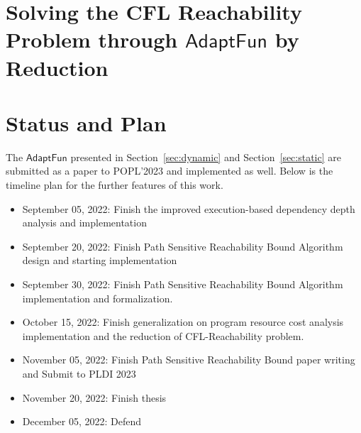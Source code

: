 \documentclass[a4paper,11pt]{article}
\newcommand{\THESYSTEM}{\textsf{AdaptFun}}
\begin{document}
\section{Solving the CFL Reachability Problem through $\THESYSTEM$ by Reduction}
\label{sec:cfl_reduction}


\section{Status and Plan}
The $\THESYSTEM$ presented in Section~\ref{sec:dynamic} and Section~\ref{sec:static} are submitted as a paper to POPL'2023 and implemented as well. Below is the timeline plan for the further features of this work.
\begin{itemize}
\item September 05, 2022: Finish the improved execution-based dependency depth analysis and implementation
\item September 20, 2022: Finish Path Sensitive Reachability Bound Algorithm design and starting implementation
\item September 30, 2022: Finish Path Sensitive Reachability Bound Algorithm implementation and formalization.
\item October 15, 2022:  Finish generalization on program resource cost analysis implementation 
and the reduction of CFL-Reachability problem.
\item November 05, 2022: Finish Path Sensitive Reachability Bound paper writing and Submit to PLDI 2023
\item November 20, 2022: Finish thesis
\item December 05, 2022: Defend
\end{itemize}




\end{document}
